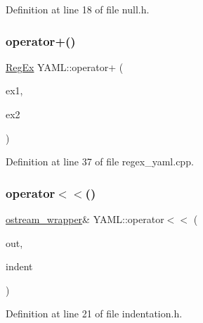 Definition at line 18 of file null.\+h.

\mbox{\label{namespace_y_a_m_l_ab85624cc9fa409be64dd6dbce0cdc458}} 
\subsubsection{\texorpdfstring{operator+()}{operator+()}}
{\footnotesize\ttfamily \mbox{\hyperlink{class_y_a_m_l_1_1_reg_ex}{Reg\+Ex}} Y\+A\+M\+L\+::operator+ (\begin{DoxyParamCaption}\item[{const \mbox{\hyperlink{class_y_a_m_l_1_1_reg_ex}{Reg\+Ex}} \&}]{ex1,  }\item[{const \mbox{\hyperlink{class_y_a_m_l_1_1_reg_ex}{Reg\+Ex}} \&}]{ex2 }\end{DoxyParamCaption})}



Definition at line 37 of file regex\+\_\+yaml.\+cpp.

\mbox{\label{namespace_y_a_m_l_a0f06b3ab1ad090af5004ef6a2a4e2ebd}} 
\subsubsection{\texorpdfstring{operator$<$$<$()}{operator<<()}\hspace{0.1cm}{\footnotesize\ttfamily [1/35]}}
{\footnotesize\ttfamily \mbox{\hyperlink{class_y_a_m_l_1_1ostream__wrapper}{ostream\+\_\+wrapper}}\& Y\+A\+M\+L\+::operator$<$$<$ (\begin{DoxyParamCaption}\item[{\mbox{\hyperlink{class_y_a_m_l_1_1ostream__wrapper}{ostream\+\_\+wrapper}} \&}]{out,  }\item[{const \mbox{\hyperlink{struct_y_a_m_l_1_1_indentation}{Indentation}} \&}]{indent }\end{DoxyParamCaption})\hspace{0.3cm}{\ttfamily [inline]}}



Definition at line 21 of file indentation.\+h.

\mbox{\label{namespace_y_a_m_l_afb2b66c89c934e94fe887b2ed52aae4f}} 
